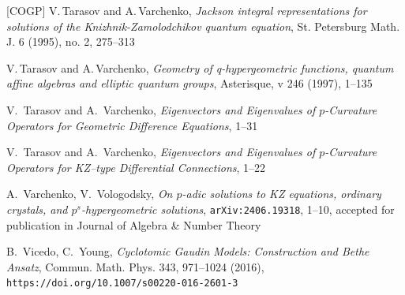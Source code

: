 \documentclass[12pt]{amsart}
\theoremstyle{definition} %
\numberwithin{equation}{section}
\theoremstyle{definition}
\let\bi\bibitem
\begin{document}
\begin{thebibliography}{[COGP]}
\bi[TV1]{TV1}
V.\,Tarasov and A.\,Varchenko, {\it
Jackson integral representations for solutions of the Knizhnik-Zamolodchikov quantum equation},
St. Petersburg Math. J. 6 (1995), no. 2, 275--313

\bi[TV2]{TV2}
V.\,Tarasov and A.\,Varchenko, {\it
Geometry of q-hypergeometric functions, quantum affine algebras and elliptic quantum groups},
Asterisque, v 246 (1997), 1--135

\bi[TV3]{TV3}
V.~Tarasov and A.~Varchenko,
{\it Eigenvectors and Eigenvalues of $p$-Curvature Operators for Geometric Difference Equations}, 1--31



\bi[TV4]{TV4}
V.~Tarasov and A.~Varchenko,
{\it Eigenvectors and Eigenvalues of $p$-Curvature  Operators for  KZ--type Differential Connections}, 1--22

\bi[VV]{VV} A.~Varchenko, V.~Vologodsky,
{\it On $p$-adic solutions to KZ equations, ordinary crystals,
and $p^s$-hypergeometric solutions},
{\tt arXiv:2406.19318}, 1--10, accepted for publication in Journal of Algebra \& Number Theory

\bi[VY]{VY} B.~Vicedo, C.~Young,
{\it Cyclotomic Gaudin Models: Construction and Bethe Ansatz}, Commun. Math. Phys. 343, 971--1024 (2016),
\\
{\tt https://doi.org/10.1007/s00220-016-2601-3}

\end{thebibliography}
\end{document}
